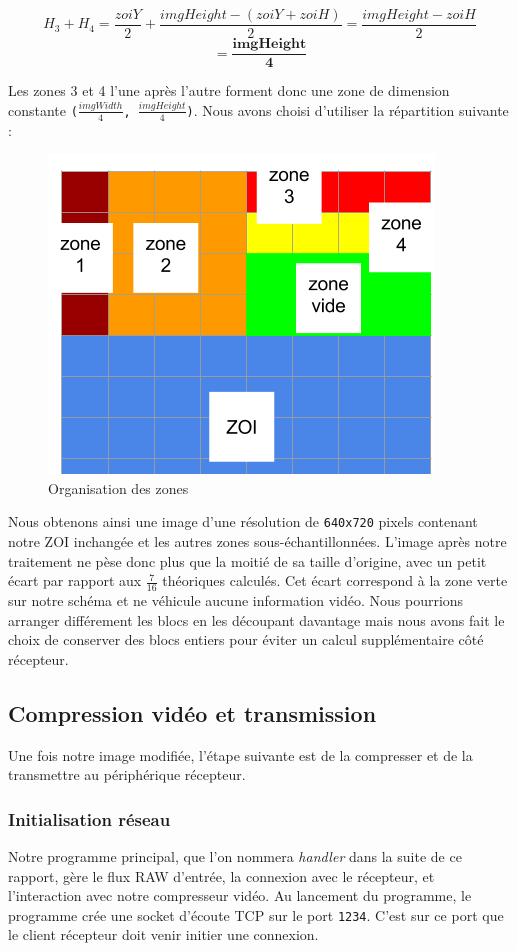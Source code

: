 \documentclass[11pt,a4paper]{article}
\begin{document}
$$ H_3 + H_4 = \frac{zoiY}{2} + \frac{imgHeight-(zoiY+zoiH)}{2} = \frac{imgHeight - zoiH}{2} $$
$$ = \mathbf{\frac{imgHeight}{4}} $$

Les zones 3 et 4 l'une après l'autre forment donc une zone de dimension constante \texttt{($\frac{imgWidth}{4}$, $\frac{imgHeight}{4}$)}.
Nous avons choisi d'utiliser la répartition suivante :

\begin{figure}[H]
\begin{center}
\includegraphics[scale=0.4]{images/decoupage2.png}
\end{center}
\caption{Organisation des zones}
\label{}
\end{figure}

\bigbreak
Nous obtenons ainsi une image d'une résolution de \texttt{640x720} pixels contenant notre ZOI inchangée et les autres zones sous-échantillonnées.
L'image après notre traitement ne pèse donc plus que la moitié de sa taille d'origine, avec un petit écart par rapport aux $\frac{7}{16}$ théoriques calculés.
Cet écart correspond à la zone verte sur notre schéma et ne véhicule aucune information vidéo.
Nous pourrions arranger différement les blocs en les découpant davantage mais nous avons fait le choix de conserver des blocs entiers pour éviter un calcul supplémentaire côté récepteur.

\subsection{Compression vidéo et transmission}
Une fois notre image modifiée, l'étape suivante est de la compresser et de la transmettre au périphérique récepteur.

\subsubsection{Initialisation réseau}
Notre programme principal, que l'on nommera \textit{handler} dans la suite de ce rapport, gère le flux RAW d'entrée, la connexion avec le récepteur, et l'interaction avec notre compresseur vidéo.
Au lancement du programme, le programme crée une socket d'écoute TCP sur le port \texttt{1234}.
C'est sur ce port que le client récepteur doit venir initier une connexion.
\end{document}
